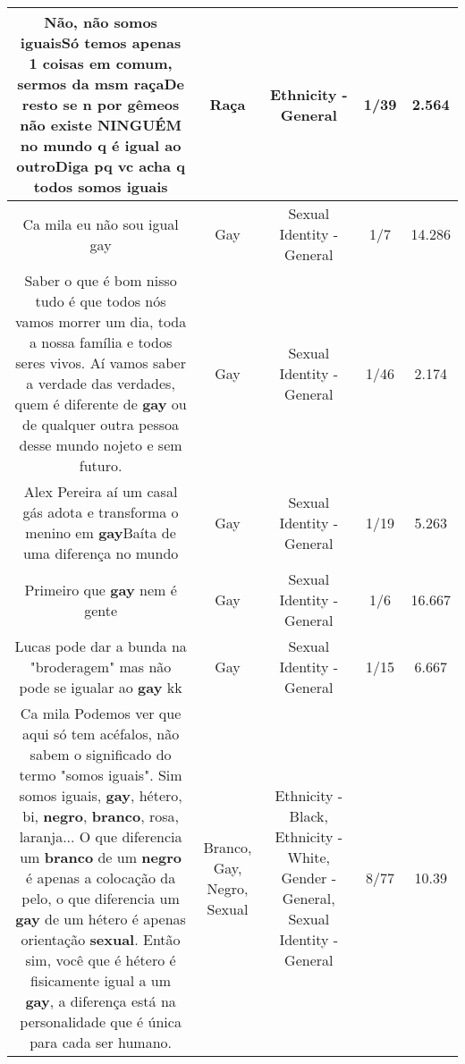 \documentclass[11pt]{article}
\newlength\mylength
\begin{document}
\begin{center}
\begin{longtable}{|C{.65\mylength}|C{.30\mylength}|C{.12\mylength}|C{.12\mylength}|C{.12\mylength}|}
  \small Não, não somos iguaisSó temos apenas 1 coisas em comum, sermos da msm \textbf{raça}De resto se n por gêmeos não existe NINGUÉM no mundo q é igual ao outroDiga pq vc acha q todos somos iguais\normalsize   & Raça & Ethnicity - General & 1/39 & 2.564 \\  \hline
  \small Ca mila eu não sou igual gay\normalsize   & Gay & Sexual Identity - General & 1/7 & 14.286 \\  \hline
  \small Saber o que é bom nisso tudo é  que todos nós vamos morrer um dia, toda a nossa família e todos seres vivos. Aí vamos saber a verdade das verdades, quem é diferente de \textbf{gay} ou de qualquer outra pessoa desse mundo nojeto e sem futuro.\normalsize   & Gay & Sexual Identity - General & 1/46 & 2.174 \\  \hline
  \small Alex Pereira aí um casal gás adota e transforma o menino em \textbf{gay}Baíta de uma diferença no mundo\normalsize   & Gay & Sexual Identity - General & 1/19 & 5.263 \\  \hline
  \small Primeiro que \textbf{gay} nem é gente\normalsize   & Gay & Sexual Identity - General & 1/6 & 16.667 \\  \hline
  \small Lucas pode dar a bunda na "broderagem" mas não pode se igualar ao \textbf{gay}  kk\normalsize   & Gay & Sexual Identity - General & 1/15 & 6.667 \\  \hline
  \small Ca mila Podemos ver que  aqui só tem   acéfalos, não sabem o significado do termo "somos iguais". Sim somos iguais, \textbf{gay}, hétero, bi, \textbf{negro}, \textbf{branco}, rosa, laranja... O que diferencia um \textbf{branco} de um \textbf{negro} é apenas a colocação da pelo, o que diferencia um \textbf{gay} de um hétero é apenas orientação \textbf{sexual}. Então sim, você que é hétero é fisicamente igual a um \textbf{gay}, a diferença está na personalidade que é única para cada ser humano.\normalsize   & Branco, Gay, Negro, Sexual & Ethnicity - Black, Ethnicity - White, Gender - General, Sexual Identity - General & 8/77 & 10.39 \\  \hline

\end{longtable}
\end{center}
\end{document}
